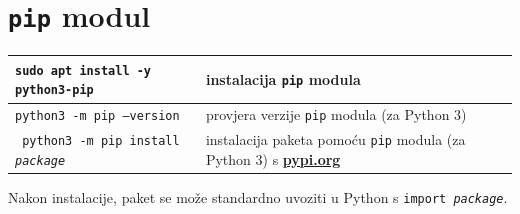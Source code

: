 \documentclass[10pt]{article}
\begin{document}
    \section*{\color{NavyBlue} \texttt{pip} modul}
    \begin{tabular}{|>{\tt}p{8.00cm}|>{}p{16.50cm}|}
        \hline
        sudo apt install -y python3-pip  & instalacija \texttt{pip} modula
        \\ \hline
        python3 -m pip ---version  & provjera verzije \texttt{pip} modula (za Python 3)
        \\ \hline
        python3 -m pip install \textit{package} & instalacija paketa pomoću \texttt{pip} modula (za Python 3) s \href{https://pypi.org/}{\textbf{pypi.org}}
        \\ \hline
    \end{tabular}
    \begin{center}
        Nakon instalacije, paket se može standardno uvoziti u Python s \texttt{import \textit{package}}.
    \end{center}
\end{document}
